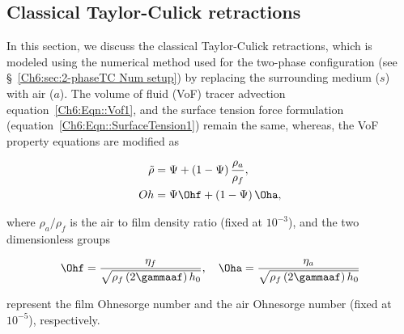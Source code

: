 \begin{subappendices}
	\section{Classical Taylor-Culick retractions}\label{App::ClassicalTC}
	
	In this section, we discuss the classical Taylor-Culick retractions, which is modeled using the numerical method used for the two-phase configuration (see \S~\ref{Ch6:sec:2-phaseTC Num setup}) by replacing the surrounding medium ($s$) with air ($a$). The volume of fluid (VoF) tracer advection equation~\eqref{Ch6:Eqn::Vof1}, and the \citet{brackbill1992continuum} surface tension force formulation (equation~\eqref{Ch6:Eqn::SurfaceTension1}) remain the same, whereas, the VoF property equations are modified as
	
	\begin{align}
		\label{Eqn::density1}
		\tilde{\rho} &= \Psi + \left(1-\Psi\right)\frac{\rho_{a}}{\rho_{f}},\\
		\label{Eqn::Oh1}
		Oh &= \Psi \Ohf + \left(1-\Psi\right)\Oha,
	\end{align}
	
	\noindent where $\rho_a/\rho_f$ is the air to film density ratio (fixed at $10^{-3}$), and the two dimensionless groups
	
	\begin{align}
		\label{Eqn::Ohfa}
		\Ohf = \frac{\eta_f}{\sqrt{\rho_f\left(2\gammaaf\right)h_0}}, \quad \Oha = \frac{\eta_a}{\sqrt{\rho_f\left(2\gammaaf\right)h_0}}
	\end{align}
	
	\noindent  represent the film Ohnesorge number and the air Ohnesorge number (fixed at $10^{-5}$), respectively. 
	

\end{subappendices}
